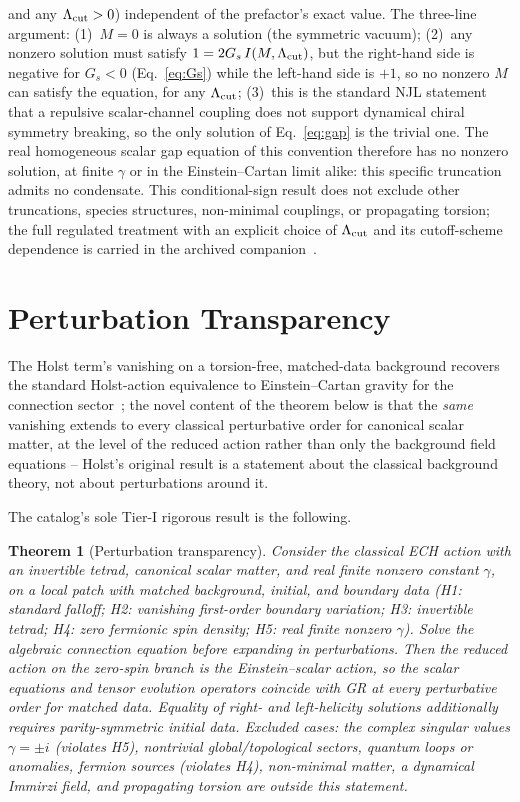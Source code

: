 \documentclass[aps,prd,twocolumn,superscriptaddress,preprintnumbers,nofootinbib,longbibliography,floatfix]{revtex4-2}
\newtheorem{theorem}{Theorem}
\begin{document}
and any $\Lambda_{\rm cut}>0$) independent of the prefactor's exact
value. The
three-line argument: (1)~$M=0$ is always a solution (the symmetric
vacuum); (2)~any nonzero solution must satisfy
$1=2G_s\,I(M,\Lambda_{\rm cut})$, but the right-hand side is negative
for $G_s<0$ (Eq.~\eqref{eq:Gs}) while the left-hand side is $+1$, so no
nonzero $M$ can satisfy the equation, for any $\Lambda_{\rm cut}$; (3)~this
is the standard NJL statement that a repulsive scalar-channel coupling
does not support dynamical chiral symmetry breaking, so the only
solution of Eq.~\eqref{eq:gap} is the trivial one. The real homogeneous
scalar gap equation of this convention therefore has no nonzero
solution, at finite $\gamma$ or in the Einstein--Cartan limit alike: this
specific truncation admits no condensate. This conditional-sign result
does not exclude other truncations, species structures, non-minimal
couplings, or propagating torsion; the full regulated treatment with an
explicit choice of $\Lambda_{\rm cut}$ and its cutoff-scheme dependence
is carried in the archived companion~\cite{Golden2026P1a}.

\section{Perturbation Transparency}\label{sec:transparency}

The Holst term's vanishing on a torsion-free, matched-data background
recovers the standard Holst-action equivalence to Einstein--Cartan
gravity for the connection sector~\cite{Holst1996}; the novel content of
the theorem below is that the \emph{same} vanishing extends to every
classical perturbative order for canonical scalar matter, at the level of
the reduced action rather than only the background field equations --
Holst's original result is a statement about the classical background
theory, not about perturbations around it.

The catalog's sole Tier-I rigorous result is the following.

\begin{theorem}[Perturbation transparency]\label{thm:transparency}
Consider the classical ECH action with an invertible tetrad, canonical
scalar matter, and real finite nonzero constant $\gamma$, on a local
patch with matched background, initial, and boundary data (H1: standard
falloff; H2: vanishing first-order boundary variation; H3: invertible
tetrad; H4: zero fermionic spin density; H5: real finite nonzero
$\gamma$). Solve the algebraic connection equation before expanding in
perturbations. Then the reduced action on the zero-spin branch is the
Einstein--scalar action, so the scalar equations and tensor evolution
operators coincide with GR at every perturbative order for matched data.
Equality of right- and left-helicity \emph{solutions} additionally
requires parity-symmetric initial data. Excluded cases: the complex
singular values $\gamma=\pm i$ (violates H5), nontrivial
global/topological sectors, quantum loops or anomalies, fermion sources
(violates H4), non-minimal matter, a dynamical Immirzi field, and
propagating torsion are outside this statement.
\end{theorem}
\end{document}
